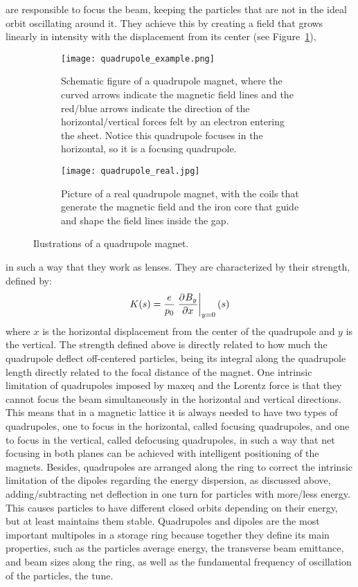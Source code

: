 \begin{description}[align=left]
        \item[Quadrupoles:] are responsible to focus the beam, keeping the particles that are not in the ideal orbit oscillating around it. They achieve this by creating a field that grows linearly in intensity with the displacement from its center (see Figure~\ref{fig:quadrupole}),
        \begin{figure}[t!]
            \centering
            \begin{subfigure}[c]{0.47\textwidth}
                \centering
                \texttt{[image: quadrupole\_example.png]}
                \caption{Schematic figure of a quadrupole magnet, where the curved arrows indicate the magnetic field lines and the red/blue arrows indicate the direction of the horizontal/vertical forces felt by an electron entering the sheet. Notice this quadrupole focuses in the horizontal, so it is a focusing quadrupole.}
            \end{subfigure}\hfill
            \begin{subfigure}[c]{0.5\textwidth}
                \texttt{[image: quadrupole\_real.jpg]}
                \caption{Picture of a real quadrupole magnet, with the coils that generate the magnetic field and the iron core that guide and shape the field lines inside the gap.}
            \end{subfigure}
            \caption{Ilustrations of a quadrupole magnet.}
            \label{fig:quadrupole}
        \end{figure}
        in such a way that they work as lenses. They are characterized by their strength, defined by:
        \begin{align}
            K(s) = \frac{e}{p_0}\left.\frac{\partial^{{}}B_y}{\partial x^{{}}}\right|_{y=0}(s)
        \end{align}
        where $x$ is the horizontal displacement from the center of the quadrupole and $y$ is the vertical. The strength defined above is directly related to how much the quadrupole deflect off-centered particles, being its integral along the quadrupole length directly related to the focal distance of the magnet. One intrinsic limitation of quadrupoles imposed by \gls{maxeq} and the Lorentz force is that they cannot focus the beam simultaneously in the horizontal and vertical directions. This means that in a magnetic lattice it is always needed to have two types of quadrupoles, one to focus in the horizontal, called focusing quadrupoles, and one to focus in the vertical, called defocusing quadrupoles, in such a way that net focusing in both planes can be achieved with intelligent positioning of the magnets. Besides, quadrupoles are arranged along the ring to correct the intrinsic limitation of the dipoles regarding the energy dispersion, as discussed above, adding/subtracting net deflection in one turn for particles with more/less energy. This causes particles to have different closed orbits depending on their energy, but at least maintains them stable. Quadrupoles and dipoles are the most important multipoles in a storage ring because together they define its main properties, such as the particles average energy, the transverse beam emittance, and beam sizes along the ring, as well as the fundamental frequency of oscillation of the particles, the tune.

\end{description}
